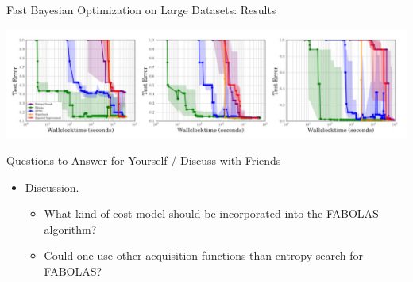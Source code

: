 \begin{frame}[c]{Fast Bayesian Optimization on Large Datasets: Results}

\centering
\includegraphics[width=1.\textwidth]{../w07_hpo_speedup/images/fabolas/fabolas_results.jpg}

\end{frame}


\begin{frame}{Questions to Answer for Yourself / Discuss with Friends}

\bigskip

\begin{itemize}
    \item \alert{Discussion.} 
    \begin{itemize}
        \item What kind of cost model should be incorporated into the FABOLAS algorithm?
        \item Could one use other acquisition functions than entropy search for FABOLAS?
    \end{itemize}
    

\end{itemize}

\end{frame}